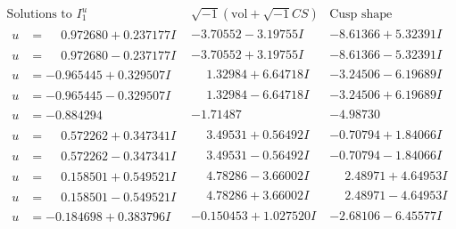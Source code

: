 \documentclass[1p]{elsarticle_modified}
\theoremstyle{definition}
\newcommand{\I}{\sqrt{-1}}
\begin{document}
$$\begin{array}{c|c|c}  
\text{Solutions to }I^u_{1}& \I (\text{vol} + \sqrt{-1}CS) & \text{Cusp shape}\\
 \hline 
\begin{aligned}
u &= \phantom{-}0.972680 + 0.237177 I\end{aligned}
 & -3.70552 - 3.19755 I & -8.61366 + 5.32391 I \\ \hline\begin{aligned}
u &= \phantom{-}0.972680 - 0.237177 I\end{aligned}
 & -3.70552 + 3.19755 I & -8.61366 - 5.32391 I \\ \hline\begin{aligned}
u &= -0.965445 + 0.329507 I\end{aligned}
 & \phantom{-}1.32984 + 6.64718 I & -3.24506 - 6.19689 I \\ \hline\begin{aligned}
u &= -0.965445 - 0.329507 I\end{aligned}
 & \phantom{-}1.32984 - 6.64718 I & -3.24506 + 6.19689 I \\ \hline\begin{aligned}
u &= -0.884294\phantom{ +0.000000I}\end{aligned}
 & -1.71487\phantom{ +0.000000I} & -4.98730\phantom{ +0.000000I} \\ \hline\begin{aligned}
u &= \phantom{-}0.572262 + 0.347341 I\end{aligned}
 & \phantom{-}3.49531 + 0.56492 I & -0.70794 + 1.84066 I \\ \hline\begin{aligned}
u &= \phantom{-}0.572262 - 0.347341 I\end{aligned}
 & \phantom{-}3.49531 - 0.56492 I & -0.70794 - 1.84066 I \\ \hline\begin{aligned}
u &= \phantom{-}0.158501 + 0.549521 I\end{aligned}
 & \phantom{-}4.78286 - 3.66002 I & \phantom{-}2.48971 + 4.64953 I \\ \hline\begin{aligned}
u &= \phantom{-}0.158501 - 0.549521 I\end{aligned}
 & \phantom{-}4.78286 + 3.66002 I & \phantom{-}2.48971 - 4.64953 I \\ \hline\begin{aligned}
u &= -0.184698 + 0.383796 I\end{aligned}
 & -0.150453 + 1.027520 I & -2.68106 - 6.45577 I \\ \hline\begin{aligned}

\end{aligned}
\end{array}$$
\end{document}
